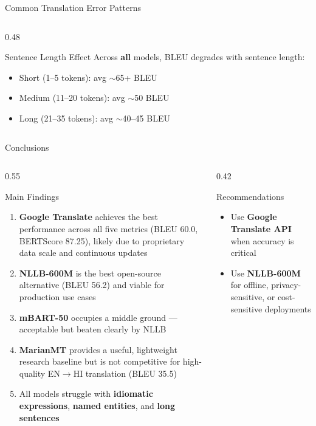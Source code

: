 \documentclass[aspectratio=169]{beamer}
\begin{document}
\begin{frame}{Common Translation Error Patterns}
\begin{columns}[T]
\begin{column}{0.48\textwidth}
\begin{block}{Sentence Length Effect}
        Across \textbf{all} models, BLEU degrades with sentence length:
        \begin{itemize}
          \item Short (1--5 tokens): avg $\sim$65+ BLEU
          \item Medium (11--20 tokens): avg $\sim$50 BLEU
          \item Long (21--35 tokens): avg $\sim$40--45 BLEU
        \end{itemize}
      \end{block}
    \end{column}
  \end{columns}
\end{frame}

\begin{frame}{Conclusions}
  \begin{columns}[T]
    \begin{column}{0.55\textwidth}
      \begin{block}{Main Findings}
        \begin{enumerate}
          \item \textbf{Google Translate} achieves the best performance across all five metrics (BLEU 60.0, BERTScore 87.25), likely due to proprietary data scale and continuous updates
          \item \textbf{NLLB-600M} is the best open-source alternative (BLEU 56.2) and viable for production use cases
          \item \textbf{mBART-50} occupies a middle ground — acceptable but beaten clearly by NLLB
          \item \textbf{MarianMT} provides a useful, lightweight research baseline but is not competitive for high-quality EN$\rightarrow$HI translation (BLEU 35.5)
          \item All models struggle with \textbf{idiomatic expressions}, \textbf{named entities}, and \textbf{long sentences}
        \end{enumerate}
      \end{block}
    \end{column}
    \begin{column}{0.42\textwidth}
      \begin{alertblock}{Recommendations}
        \begin{itemize}
          \item Use \textbf{Google Translate API} when accuracy is critical
          \item Use \textbf{NLLB-600M} for offline, privacy-sensitive, or cost-sensitive deployments

\end{itemize}
\end{alertblock}
\end{column}
\end{columns}
\end{frame}
\end{document}
